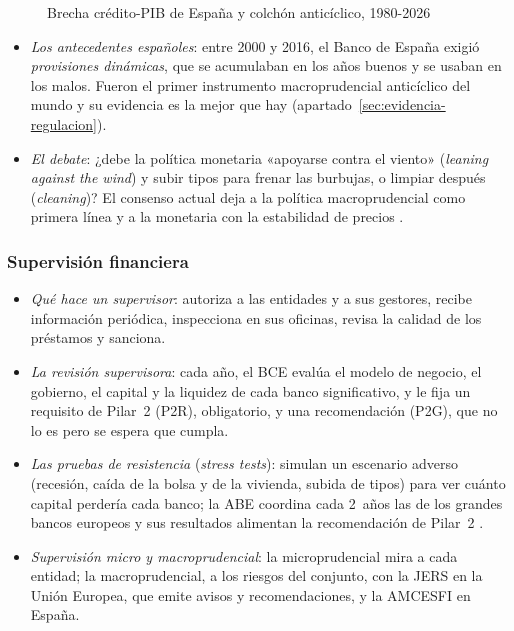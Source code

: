 \documentclass[11pt]{article}
\begin{document}
\begin{figure}[H]
\centering
\caption{Brecha crédito-PIB de España y colchón anticíclico, 1980-2026}\label{fig:brecha}
\end{figure}

\begin{itemize}
\item \emph{Los antecedentes españoles}: entre 2000 y 2016, el Banco de España exigió \emph{provisiones dinámicas}, que se acumulaban en los años buenos y se usaban en los malos. Fueron el primer instrumento macroprudencial anticíclico del mundo y su evidencia es la mejor que hay (apartado~\ref{sec:evidencia-regulacion}).
\item \emph{El debate}: ¿debe la política monetaria «apoyarse contra el viento» (\emph{leaning against the wind}) y subir tipos para frenar las burbujas, o limpiar después (\emph{cleaning})? El consenso actual deja a la política macroprudencial como primera línea y a la monetaria con la estabilidad de precios  .
\end{itemize}

\subsubsection{Supervisión financiera}\label{sec:supervision}

\begin{itemize}
\item \emph{Qué hace un supervisor}: autoriza a las entidades y a sus gestores, recibe información periódica, inspecciona en sus oficinas, revisa la calidad de los préstamos y sanciona.
\item \emph{La revisión supervisora}: cada año, el BCE evalúa el modelo de negocio, el gobierno, el capital y la liquidez de cada banco significativo, y le fija un requisito de Pilar~2 (P2R), obligatorio, y una recomendación (P2G), que no lo es pero se espera que cumpla\nocite{BCE2025SREP}.
\item \emph{Las pruebas de resistencia} (\emph{stress tests}): simulan un escenario adverso (recesión, caída de la bolsa y de la vivienda, subida de tipos) para ver cuánto capital perdería cada banco; la ABE coordina cada 2~años las de los grandes bancos europeos y sus resultados alimentan la recomendación de Pilar~2 .
\item \emph{Supervisión micro y macroprudencial}: la microprudencial mira a cada entidad; la macroprudencial, a los riesgos del conjunto, con la JERS en la Unión Europea, que emite avisos y recomendaciones, y la AMCESFI en España.
\end{itemize}
\end{document}
